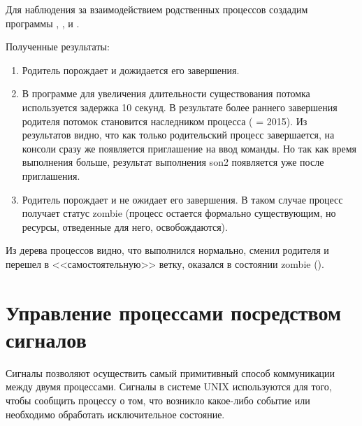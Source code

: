 Для наблюдения за взаимодействием родственных процессов создадим программы , ,  и .









Полученные результаты:
\begin{enumerate}
	\item Родитель порождает  и дожидается его завершения. 
	\item В программе  для увеличения длительности существования потомка используется задержка 10 секунд. В результате более раннего завершения родителя потомок становится наследником процесса  ( = 2015). Из результатов видно, что как только родительский процесс завершается, на консоли сразу же появляется приглашение на ввод команды. Но так как время выполнения  больше, результат выполнения son2 появляется уже после приглашения.
	\item Родитель порождает  и не ожидает его завершения. В таком случае процесс получает статус zombie (процесс остается формально существующим, но ресурсы, отведенные для него, освобождаются).
\end{enumerate}





Из дерева процессов видно, что  выполнился нормально,  сменил родителя и перешел в <<самостоятельную>> ветку,  оказался в состоянии zombie ().

\section{Управление процессами посредством сигналов}

Сигналы позволяют осуществить самый примитивный способ
коммуникации между двумя процессами. Сигналы в системе UNIX  используются для того, чтобы сообщить процессу о том, что возникло какое-либо событие или необходимо обработать
исключительное состояние. 

